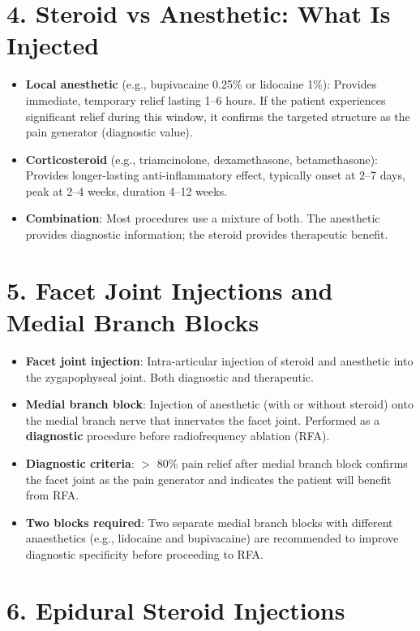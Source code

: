 \section{4. Steroid vs Anesthetic: What Is Injected}

\begin{itemize}
  \item \textbf{Local anesthetic} (e.g., bupivacaine 0.25\% or lidocaine 1\%): Provides immediate, temporary relief lasting 1--6 hours. If the patient experiences significant relief during this window, it confirms the targeted structure as the pain generator (diagnostic value).
  \item \textbf{Corticosteroid} (e.g., triamcinolone, dexamethasone, betamethasone): Provides longer-lasting anti-inflammatory effect, typically onset at 2--7 days, peak at 2--4 weeks, duration 4--12 weeks.
  \item \textbf{Combination}: Most procedures use a mixture of both. The anesthetic provides diagnostic information; the steroid provides therapeutic benefit.
\end{itemize}

\section{5. Facet Joint Injections and Medial Branch Blocks}

\begin{itemize}
  \item \textbf{Facet joint injection}: Intra-articular injection of steroid and anesthetic into the zygapophyseal joint. Both diagnostic and therapeutic.
  \item \textbf{Medial branch block}: Injection of anesthetic (with or without steroid) onto the medial branch nerve that innervates the facet joint. Performed as a \textbf{diagnostic} procedure before radiofrequency ablation (RFA).
  \item \textbf{Diagnostic criteria}: $>$ 80\% pain relief after medial branch block confirms the facet joint as the pain generator and indicates the patient will benefit from RFA.
  \item \textbf{Two blocks required}: Two separate medial branch blocks with different anaesthetics (e.g., lidocaine and bupivacaine) are recommended to improve diagnostic specificity before proceeding to RFA.
\end{itemize}

\section{6. Epidural Steroid Injections}

